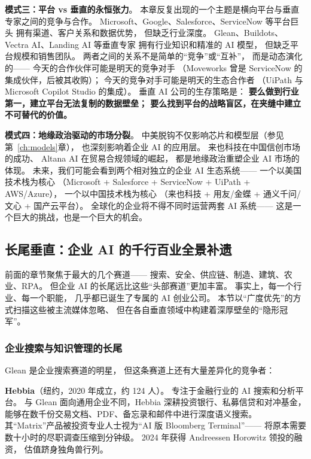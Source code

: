 \textbf{模式三：平台 vs 垂直的永恒张力}。
本章反复出现的一个主题是横向平台与垂直专家之间的竞争与合作。
Microsoft、Google、Salesforce、ServiceNow 等平台巨头
拥有渠道、客户关系和数据优势，
但缺乏行业深度。
Glean、Buildots、Vectra AI、Landing AI 等垂直专家
拥有行业知识和精准的 AI 模型，
但缺乏平台规模和销售团队。
两者之间的关系不是简单的``竞争''或``互补''，
而是动态演化的——
今天的合作伙伴可能是明天的竞争对手
（Moveworks 曾是 ServiceNow 的集成伙伴，后被其收购）；
今天的竞争对手可能是明天的生态合作者
（UiPath 与 Microsoft Copilot Studio 的集成）。
垂直 AI 公司的生存策略是：
\textbf{要么做到行业第一，建立平台无法复制的数据壁垒；
要么找到平台的战略盲区，在夹缝中建立不可替代的价值。}

\textbf{模式四：地缘政治驱动的市场分裂}。
中美脱钩不仅影响芯片和模型层（参见第~\ref{ch:models}章），
也深刻影响着企业 AI 的应用层。
来也科技在中国信创市场的成功、
Altana AI 在贸易合规领域的崛起，
都是地缘政治重塑企业 AI 市场的体现。
未来，我们可能会看到两个相对独立的企业 AI 生态系统——
一个以美国技术栈为核心
（Microsoft + Salesforce + ServiceNow + UiPath + AWS/Azure），
一个以中国技术栈为核心
（来也科技 + 用友/金蝶 + 通义千问/文心 + 国产云平台）。
全球化的企业将不得不同时运营两套 AI 系统——
这是一个巨大的挑战，也是一个巨大的机会。

\subsection{长尾垂直：企业 AI 的千行百业全景补遗}

前面的章节聚焦于最大的几个赛道——
搜索、安全、供应链、制造、建筑、农业、RPA。
但企业 AI 的长尾远比这些``头部赛道''更加丰富。
事实上，每一个行业、每一个职能，
几乎都已诞生了专属的 AI 创业公司。
本节以``广度优先''的方式扫描这些被主流媒体忽略、
但在各自垂直领域中构建着深厚壁垒的``隐形冠军''。

\subsubsection{企业搜索与知识管理的长尾}

Glean 是企业搜索赛道的明星，
但这条赛道上还有大量差异化的竞争者：

\textbf{Hebbia}（纽约，2020 年成立，约 124 人）。
专注于金融行业的 AI 搜索和分析平台。
与 Glean 面向通用企业不同，Hebbia 深耕投资银行、私募信贷和对冲基金，
能够在数千份交易文档、PDF、备忘录和邮件中进行深度语义搜索。
其``Matrix''产品被投资专业人士视为``AI 版 Bloomberg Terminal''——
将原本需要数十小时的尽职调查压缩到分钟级。
2024 年获得 Andreessen Horowitz 领投的融资，
估值跻身独角兽行列。

